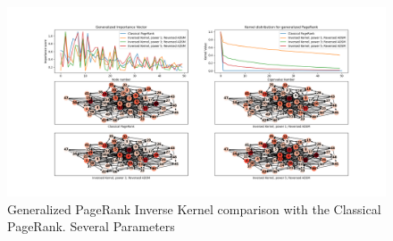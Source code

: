 \documentclass[sn-mathphys]{sn-jnl}%
\theoremstyle{thmstyleone}%
\theoremstyle{thmstyletwo}%
\theoremstyle{thmstylethree}%
\begin{document}
\begin{appendices}
\begin{figure}[H]
    \centering
    \centerline{
    \includegraphics[width= 1.25\textwidth]{results_figures/inverse_kernel_comparison.png}
    }
    \caption{Generalized PageRank Inverse Kernel comparison with the Classical PageRank. Several Parameters}
    \label{fig:inverseKcomparison}
\end{figure}

\end{appendices}



\end{document}
